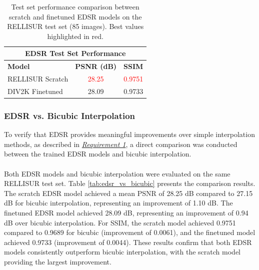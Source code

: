 \begin{table}[H]
\centering
\renewcommand{\arraystretch}{1.2}
\begin{tabular}{|l|c|c|}
\hline
\multicolumn{3}{|c|}{\cellcolor[HTML]{D8E9F7}\textbf{EDSR Test Set Performance}} \\
\hline
\rowcolor[HTML]{D8E9F7}
\textbf{Model} & \textbf{PSNR (dB)} & \textbf{SSIM} \\
\hline
RELLISUR Scratch & \textcolor{red}{28.25} & \textcolor{red}{0.9751} \\
\hline
DIV2K Finetuned & 28.09 & 0.9733 \\
\hline
\end{tabular}
\caption{Test set performance comparison between scratch and finetuned \acs{EDSR} models on the \acs{RELLISUR} test set (85 images). Best values highlighted in red.}
\label{tab:edsr_test_results}
\end{table}


\subsubsection{EDSR vs. Bicubic Interpolation}
To verify that \acs{EDSR} provides meaningful improvements over simple interpolation methods, as described in \hyperlink{req:1}{\textit{Requirement 1}}, a direct comparison was conducted between the trained \acs{EDSR} models and bicubic interpolation.
\\\\
Both \acs{EDSR} models and bicubic interpolation were evaluated on the same \acs{RELLISUR} test set. Table \ref{tab:edsr_vs_bicubic} presents the comparison results. The scratch \acs{EDSR} model achieved a mean \acs{PSNR} of 28.25 dB compared to 27.15 dB for bicubic interpolation, representing an improvement of 1.10 dB. The finetuned \acs{EDSR} model achieved 28.09 dB, representing an improvement of 0.94 dB over bicubic interpolation. For \acs{SSIM}, the scratch model achieved 0.9751 compared to 0.9689 for bicubic (improvement of 0.0061), and the finetuned model achieved 0.9733 (improvement of 0.0044). These results confirm that both \acs{EDSR} models consistently outperform bicubic interpolation, with the scratch model providing the largest improvement.

